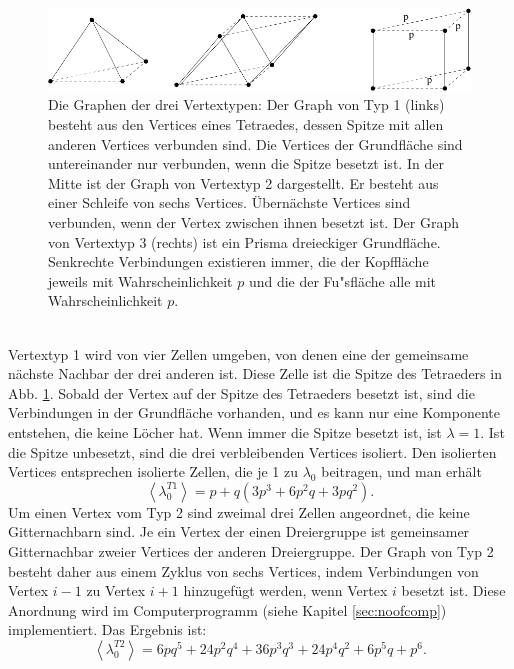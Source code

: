 \begin{figure}[htbp]
  \centering
  \includegraphics{./Fluct_topo-Figs/vertexgraph}
  \caption{Die Graphen der drei Vertextypen: Der Graph von Typ 1 (links) besteht aus den Vertices eines Tetraedes, dessen Spitze mit allen anderen Vertices verbunden sind. Die Vertices der Grundfl\"ache sind untereinander nur verbunden, wenn die Spitze besetzt ist. In der Mitte ist der Graph von Vertextyp 2 dargestellt. Er besteht aus einer Schleife von sechs Vertices. \"Ubern\"achste Vertices sind verbunden, wenn der Vertex zwischen ihnen besetzt ist. Der Graph von Vertextyp 3 (rechts) ist ein Prisma dreieckiger Grundfl\"ache. Senkrechte Verbindungen existieren immer, die der Kopffl\"ache jeweils mit Wahrscheinlichkeit $p$ und die der Fu"sfl\"ache alle mit Wahrscheinlichkeit $p$.}
  \label{fig:vertexgraph}
\end{figure}
\\Vertextyp 1 wird von vier Zellen umgeben, von denen eine der gemeinsame n\"achste Nachbar der drei anderen ist. Diese Zelle ist die Spitze des Tetraeders in Abb. \ref{fig:vertexgraph}. Sobald der Vertex auf der Spitze des Tetraeders besetzt ist, sind die Verbindungen in der Grundfl\"ache vorhanden, und es kann nur eine Komponente entstehen, die keine L\"ocher hat. Wenn immer die Spitze besetzt ist, ist $\lambda=1$. Ist die Spitze unbesetzt, sind die drei verbleibenden Vertices isoliert. Den isolierten Vertices entsprechen isolierte Zellen, die je 1 zu $\lambda_0$ beitragen, und man erh\"alt
\begin{equation}
\left<\lambda_0^{T1}\right>=p+q(3p^3+6p^2q+3pq^2).
\end{equation}
Um einen Vertex vom Typ 2 sind zweimal drei Zellen angeordnet, die keine Gitternachbarn sind. Je ein Vertex der einen Dreiergruppe ist gemeinsamer Gitternachbar zweier Vertices der anderen Dreiergruppe. Der Graph von Typ 2 besteht daher aus einem Zyklus von sechs Vertices, indem Verbindungen von Vertex $i-1$ zu Vertex $i+1$ hinzugef\"ugt werden, wenn Vertex $i$ besetzt ist. Diese Anordnung wird im Computerprogramm (siehe Kapitel \ref{sec:noofcomp}) implementiert. Das Ergebnis ist:
\begin{equation}
\left<\lambda_0^{T2}\right>=6pq^5+24p^2q^4+36p^3q^3+24p^4q^2+6p^5q+p^6.
\end{equation}
